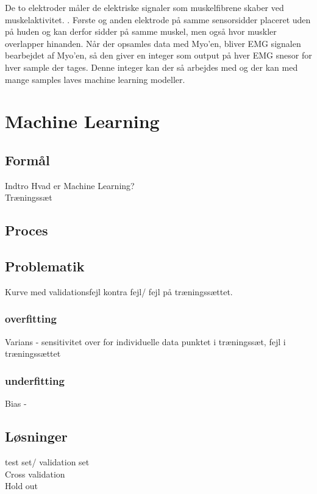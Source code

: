 De to elektroder måler de elektriske signaler som muskelfibrene skaber ved muskelaktivitet.
\citep{RefWorks:13}. Første og anden elektrode på samme sensorsidder placeret uden på huden og kan derfor sidder på samme muskel, men også hvor muskler overlapper hinanden. Når der opsamles data med Myo'en, bliver EMG signalen bearbejdet af Myo'en, så den giver en integer som output på hver EMG snesor for hver sample der tages. Denne integer kan der så arbejdes med og der kan med mange samples laves machine learning modeller.

\section{Machine Learning}
\label{sec:machineLearning}

\subsection{Formål}

Indtro
Hvad er Machine Learning?
\\

Træningssæt 

\subsection{Proces}
\subsection{Problematik}

Kurve med validationsfejl kontra fejl/ fejl på træningssættet. 

\subsubsection{overfitting}
Varians - sensitivitet over for individuelle data punktet i træningssæt, fejl i træningssættet
\subsubsection{underfitting}
Bias - 

\subsection{Løsninger}
test set/ validation set
\\ Cross validation
\\ Hold out
